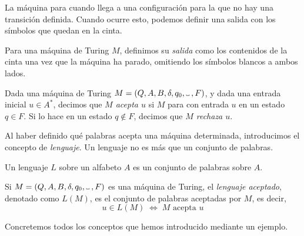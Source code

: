 La máquina para cuando llega a una configuración para la que no hay una transición definida. Cuando ocurre esto, podemos definir una salida con los símbolos que quedan en la cinta.

\begin{definicion}\label{def:salida-maquina-turing}
Para una máquina de Turing $M$, definimos su \emph{salida} como los contenidos de la cinta una vez que la máquina ha parado, omitiendo los símbolos blancos a ambos lados.
\end{definicion}

\begin{definicion}\label{def:palabra-aceptada-maquina-turing}
Dada una máquina de Turing $M=(Q, A, B, \delta, q_0, \Vtextvisiblespace\:, F)$, y dada una entrada inicial $u \in A^*$, decimos que \emph{$M$ acepta $u$} si $M$ para con entrada $u$ en un estado $q\in F$. Si lo hace en un estado $q \notin F$, decimos que \emph{$M$ rechaza $u$}.
\end{definicion}

Al haber definido qué palabras acepta una máquina determinada, introducimos el concepto de \emph{lenguaje}. Un lenguaje no es más que un conjunto de palabras.%

\begin{definicion}
    Un lenguaje $L$ sobre un alfabeto $A$ es un conjunto de palabras sobre $A$.

    Si $M=(Q, A, B, \delta, q_0, \Vtextvisiblespace\:, F)$ es una máquina de Turing, el \emph{lenguaje aceptado}, denotado como $L(M)$, es el conjunto de palabras aceptadas por $M$, es decir,
    $$
        u\in L(M)\;\iff\;M\text{ acepta }u
    $$
\end{definicion}

Concretemos todos los conceptos que hemos introducido mediante un ejemplo.

